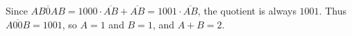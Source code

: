 Since \(\overline{AB0AB}=1000\cdot\overline{AB}+\overline{AB}=1001\cdot\overline{AB}\), the quotient is always \(1001\). Thus \(\overline{A00B}=1001\), so \(A=1\) and \(B=1\), and \(A+B=\boxed{2}\).
